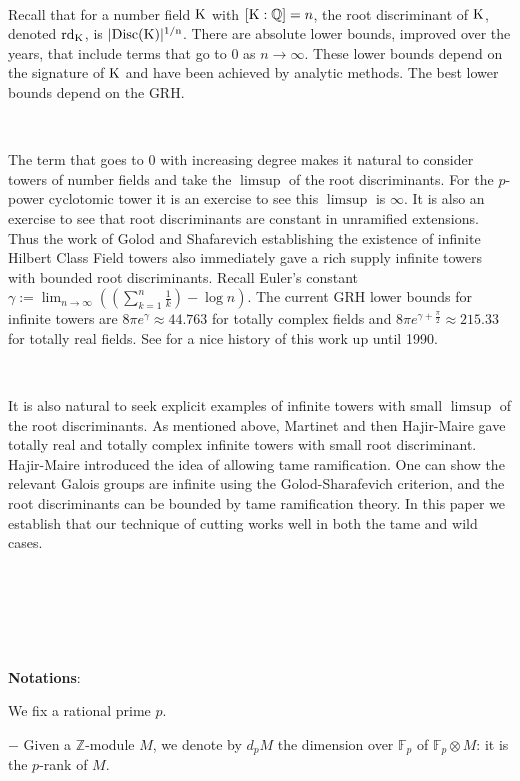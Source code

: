 \documentclass[12pt,a4paper,twoside,english]{smfart}
\def\Q{{\mathbb Q}}
\def\Z{{\mathbb Z}}
\def\fq{{\mathbb F}}
\def\K{{\rm K}}
\def\rd{{\rm rd}}
\begin{document}


\


Recall that for a number field $\K$ with $[\K:\Q]=n$, the root discriminant of $\K$, denoted $\rd_\K$, is
$|\rm{Disc}(\K)|^{1/n}$.
There are absolute lower bounds, improved over the years, that
include terms that go to $0$ as $n \to \infty$. These lower bounds depend on the signature of $\K$ and 
have been achieved by analytic methods. The best lower bounds depend on the GRH. 

\

The term that goes to $0$ with increasing degree makes it natural to consider towers of number fields and take the $\limsup$
of the root discriminants. For the $p$-power cyclotomic tower it is an exercise to see this $\limsup$ is $\infty$. It is also
an exercise to see that root discriminants are constant in unramified extensions. Thus the work of Golod and Shafarevich establishing the
existence of infinite Hilbert Class Field towers also immediately gave a rich supply infinite towers with bounded root discriminants. 
Recall Euler's constant $\gamma:= \lim_{n\to\infty}\left( (\sum^n_{k=1} \frac1k) -\log n \right)$.
The current GRH lower bounds for infinite towers are
$8\pi e^{\gamma} \approx 44.763$ for totally complex fields and $8\pi e^{\gamma+\frac{\pi}2} \approx 215.33$  for totally real fields.
See \cite{Odlyzko} for a nice history of this work up until 1990.

\

It is also natural to seek explicit examples of infinite towers with small $\limsup$ of the root discriminants. As mentioned above, Martinet and then Hajir-Maire
gave totally real and totally complex infinite towers with small root discriminant. Hajir-Maire introduced the idea of allowing tame ramification. One can show
the relevant Galois groups are infinite using the Golod-Sharafevich criterion, and the root discriminants can be bounded by tame ramification theory. 
In this paper we establish that our technique 
of cutting works well in both the tame and wild cases.




\

\

\

{\bf Notations}: 



We fix a rational prime  $p$. 

$-$ 
Given a $\Z$-module $M$, we denote by $d_p M$ the dimension over $\fq_p$ of $\fq_p \otimes M$: it is the $p$-rank of $M$. 
\end{document}
